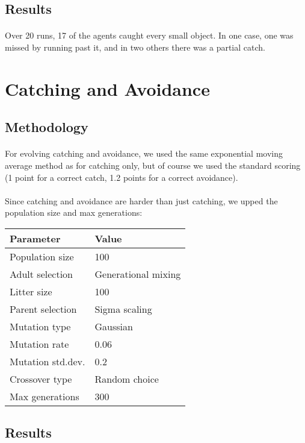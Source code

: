 \documentclass[a4paper,12pt]{article}
\begin{document}
\subsection{Results}
\paragraph{}Over 20 runs, 17 of the agents caught every small object. In one case, one was missed by running past it, and in two others there was a partial catch.

\section{Catching and Avoidance}
\subsection{Methodology}
\paragraph{}For evolving catching and avoidance, we used the same exponential moving average method as for catching only, but of course we used the standard scoring (1 point for a correct catch, 1.2 points for a correct avoidance).
\paragraph{}Since catching and avoidance are harder than just catching, we upped the population size and max generations:\\
\begin{tabular}{ll}
\hline
Parameter & Value \\
\hline \hline
Population size & 100 \\
Adult selection & Generational mixing \\
Litter size & 100 \\
Parent selection & Sigma scaling \\
Mutation type & Gaussian \\
Mutation rate & 0.06 \\
Mutation std.dev. & 0.2 \\
Crossover type & Random choice \\
Max generations & 300 \\
\hline
\end{tabular}

\subsection{Results}
\end{document}
